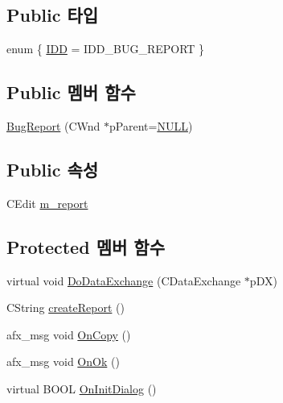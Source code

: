\subsection*{Public 타입}
\begin{DoxyCompactItemize}
\item 
enum \{ \mbox{\hyperlink{class_bug_report_ac5c6f1960b86db3b70eab6b21625913eaf9e146b90ba979e2a6a8b7a3ad251d1b}{I\+DD}} = I\+D\+D\+\_\+\+B\+U\+G\+\_\+\+R\+E\+P\+O\+RT
 \}
\end{DoxyCompactItemize}
\subsection*{Public 멤버 함수}
\begin{DoxyCompactItemize}
\item 
\mbox{\hyperlink{class_bug_report_a0b78ee082b1ca2a2a2c16db3d65842fb}{Bug\+Report}} (C\+Wnd $\ast$p\+Parent=\mbox{\hyperlink{_system_8h_a070d2ce7b6bb7e5c05602aa8c308d0c4}{N\+U\+LL}})
\end{DoxyCompactItemize}
\subsection*{Public 속성}
\begin{DoxyCompactItemize}
\item 
C\+Edit \mbox{\hyperlink{class_bug_report_aef6dd887fcfe40d98d0fa1c6cf2d2466}{m\+\_\+report}}
\end{DoxyCompactItemize}
\subsection*{Protected 멤버 함수}
\begin{DoxyCompactItemize}
\item 
virtual void \mbox{\hyperlink{class_bug_report_a5b019306aeca9497b7b6efd438a44558}{Do\+Data\+Exchange}} (C\+Data\+Exchange $\ast$p\+DX)
\item 
C\+String \mbox{\hyperlink{class_bug_report_afe00e8dd3efa190199d8d645cb702e07}{create\+Report}} ()
\item 
afx\+\_\+msg void \mbox{\hyperlink{class_bug_report_a6b74689c7cf7ed6daeaaf2dc8f1498ab}{On\+Copy}} ()
\item 
afx\+\_\+msg void \mbox{\hyperlink{class_bug_report_a2c9a7f1da33a46ca97f0ecd821e701e9}{On\+Ok}} ()
\item 
virtual B\+O\+OL \mbox{\hyperlink{class_bug_report_abcfc2e192747272d1708a1d479bfd45b}{On\+Init\+Dialog}} ()
\end{DoxyCompactItemize}


